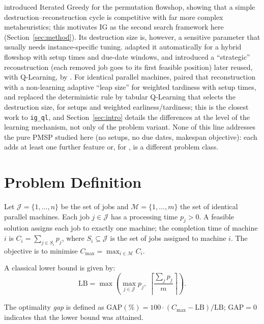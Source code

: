 \documentclass[final,3p,times,11pt,authoryear]{elsarticle}
\begin{document}
\citet{RuizStutzle2007} introduced Iterated Greedy for the permutation flowshop, showing that a simple
destruction--reconstruction cycle is competitive with far more complex metaheuristics; this motivates IG as the second
search framework here (Section~\ref{sec:method}). Its destruction size is, however, a sensitive parameter that usually
needs instance-specific tuning. \citet{MissaouiRuiz2022} adapted it automatically for a hybrid flowshop with setup times and
due-date windows, and introduced a ``strategic'' reconstruction (each removed job goes to its first feasible position) later
reused, with Q-Learning, by \citet{MissaouiOSullivan2026}. For identical parallel machines,
\citet{MissaouiOSullivanStrategicRecon2026} paired that reconstruction with a non-learning adaptive ``leap size'' for
weighted tardiness with setup times, and \citet{MissaouiOSullivan2026} replaced the deterministic rule by tabular
Q-Learning that selects the destruction size, for setups and weighted earliness/tardiness; this is the closest work to
\texttt{ig\_ql}, and Section~\ref{sec:intro} details the differences at the level of the learning mechanism, not
only of the problem variant. None of this line addresses the pure PMSP studied here (no setups, no due dates, makespan
objective): each adds at least one further feature or, for \citet{RuizStutzle2007}, is a different problem class.


\section{Problem Definition}
\label{sec:problem}

Let $\mathcal{J}=\{1,\ldots,n\}$ be the set of jobs and
$\mathcal{M}=\{1,\ldots,m\}$ the set of identical parallel machines.
Each job $j \in \mathcal{J}$ has a processing time $p_j > 0$.
A feasible solution assigns each job to exactly one machine; the
completion time of machine $i$ is $C_i = \sum_{j \in S_i} p_j$, where
$S_i \subseteq \mathcal{J}$ is the set of jobs assigned to machine $i$.
The objective is to minimise $C_{\max} = \max_{i \in \mathcal{M}} C_i$.

A classical lower bound \citep{Graham1969} is given by:
\begin{equation}
  \mathrm{LB} = \max\!\left(\max_{j \in \mathcal{J}} p_j,\;
  \left\lceil \frac{\sum_{j} p_j}{m} \right\rceil\right).
  \label{eq:lb}
\end{equation}

The optimality \emph{gap} is defined as
$\mathrm{GAP}(\%) = 100 \cdot (C_{\max} - \mathrm{LB})/\mathrm{LB}$;
$\mathrm{GAP} = 0$ indicates that the lower bound was attained.
\end{document}
